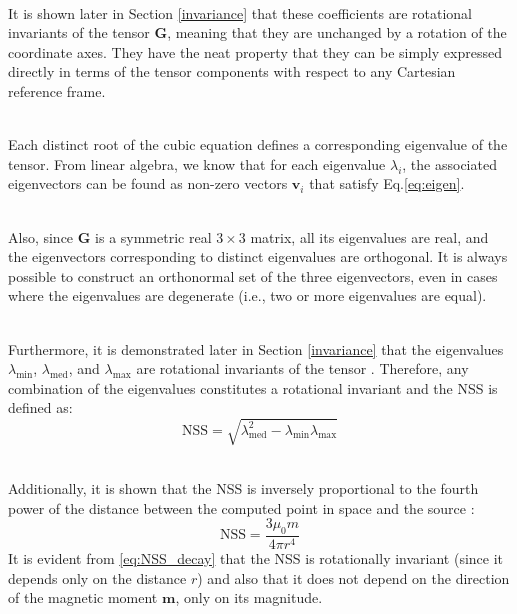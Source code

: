 \documentclass[main]{subfiles}
\begin{document}
\noindent\\
It is shown later in Section \ref{invariance} that these coefficients are rotational invariants of 
the tensor \( \mathbf{G} \), meaning that they are unchanged by a 
rotation of the coordinate axes. They have the neat property that they can be simply expressed
directly in terms of the tensor components with respect to any
Cartesian reference frame.

\noindent\\
Each distinct root of the cubic equation defines a corresponding 
eigenvalue of the tensor. From linear algebra, we know that for each eigenvalue \( \lambda_i \), the 
associated eigenvectors can be found as non-zero vectors 
\( \mathbf{v}_i \) that satisfy Eq.\ref{eq:eigen}.

\noindent\\
Also, since \( \mathbf{G} \) is a symmetric real \( 3 \times 3 \) matrix, 
all its eigenvalues are real, and the eigenvectors corresponding to 
distinct eigenvalues are orthogonal. It is always possible to construct 
an orthonormal set of the three eigenvectors, even in cases where the 
eigenvalues are degenerate (i.e., two or more eigenvalues are equal).

\noindent\\
Furthermore, it is demonstrated later in Section \ref{invariance} that the eigenvalues \( \lambda_{\text{min}} \), 
\( \lambda_{\text{med}} \), and \( \lambda_{\text{max}} \) are rotational 
invariants of the tensor \cite{NSS_single_different_dimensions}.
Therefore, any combination of the eigenvalues 
constitutes a rotational invariant and the NSS is defined as:
\begin{equation}
\text{NSS} = \sqrt{\lambda_{\text{med}}^2 - \lambda_{\text{min}} \lambda_{\text{max}}}
\label{eq:NSS}
\end{equation}

\noindent\\
Additionally, it is shown that the NSS is inversely proportional to the fourth power of 
the distance between the computed point in space and the source \cite{NSS_single_localization}:
\begin{equation}
\text{NSS} = \frac{3 \mu_0 m}{4 \pi r^4}
\label{eq:NSS_decay}
\end{equation}
It is evident from \ref{eq:NSS_decay} that the NSS is rotationally invariant (since it depends
only on the distance $r$) and also that it does not depend on the direction of the magnetic
moment $\mathbf{m}$, only on its magnitude.
\end{document}
